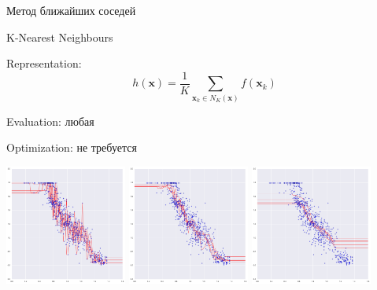 \documentclass[aspectratio=169]{beamer}
\begin{document}
\begin{frame}{Метод ближайших соседей}

K-Nearest Neighbours

\vspace{1em}
Representation:
\[
h(\mathbf{x}) = \frac{1}{K} \sum_{\mathbf{x}_k \in N_K(\mathbf{x})} f(\mathbf{x}_k)
\]

\vspace{1em}
Evaluation: любая

\vspace{1em}
Optimization: не требуется

\end{frame}

\begin{frame}

\begin{center}
\includegraphics[width=0.3\textwidth]{images/knn1.png}
\includegraphics[width=0.3\textwidth]{images/knn5.png}
\includegraphics[width=0.3\textwidth]{images/knn30.png}
\end{center}

\end{frame}
\end{document}
